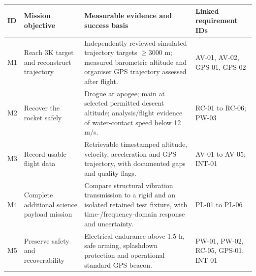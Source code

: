 \small
\begin{tabularx}{\linewidth}{@{}L{11mm}L{41mm}Y L{39mm}@{}}
\toprule{}\textbf{ID}&\textbf{Mission objective}&\textbf{Measurable evidence and success basis}&\textbf{Linked requirement IDs}\\\midrule
M1 & Reach 3K target and reconstruct trajectory & Independently reviewed simulated trajectory targets $\ge3000$ m; measured barometric altitude and organiser GPS trajectory assessed after flight. & AV-01, AV-02, GPS-01, GPS-02\\
M2 & Recover the rocket safely & Drogue at apogee; main at selected permitted descent altitude; analysis/flight evidence of water-contact speed below 12 m/s. & RC-01 to RC-06; PW-03\\
M3 & Record usable flight data & Retrievable timestamped altitude, velocity, acceleration and GPS trajectory, with documented gaps and quality flags. & AV-01 to AV-05; INT-01\\
M4 & Complete additional science payload mission & Compare structural vibration transmission to a rigid and an isolated retained test fixture, with time-/frequency-domain response and uncertainty. & PL-01 to PL-06\\
M5 & Preserve safety and recoverability & Electrical endurance above 1.5 h, safe arming, splashdown protection and operational standard GPS beacon. & PW-01, PW-02, RC-05, GPS-01, INT-01\\\bottomrule
\end{tabularx}
\normalsize

